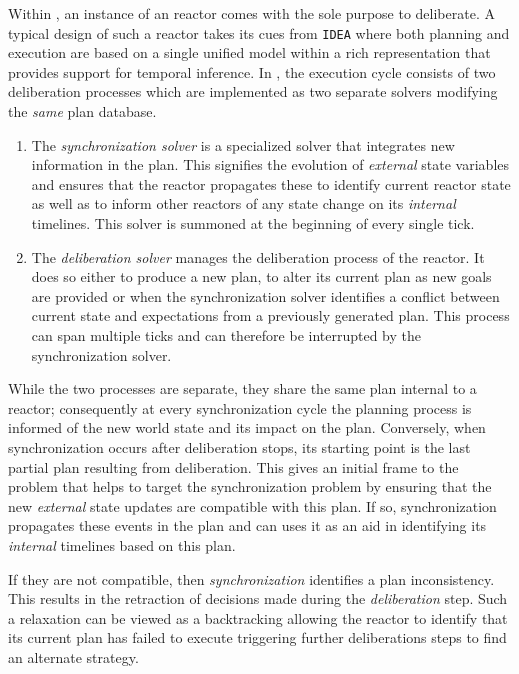 Within \rx, an instance of an \eu reactor comes with the sole purpose
to deliberate. A typical design of such a reactor takes its cues from
\texttt{IDEA} \cite{mus02, mus06} where both planning and execution
are based on a single unified model within a rich representation that
provides support for temporal inference. In \rx, the execution cycle
consists of two deliberation processes which are implemented as two
separate \eu solvers modifying the \emph{same} plan database.

\begin{enumerate}

\item The \emph{synchronization solver} is a specialized \eu solver
  that integrates new information in the plan. This signifies the
  evolution of \emph{external} state variables and ensures that the
  reactor propagates these to identify current reactor state as well
  as to inform other reactors of any state change on its
  \emph{internal} timelines. This solver is summoned at the beginning
  of every single tick.

\item The \emph{deliberation solver} manages the deliberation process
  of the reactor. It does so either to produce a new plan, to alter
  its current plan as new goals are provided or when the
  synchronization solver identifies a conflict between current state
  and expectations from a previously generated plan. This process can
  span multiple ticks and can therefore be interrupted by the
  synchronization solver.

\end{enumerate}

While the two processes are separate, they share the same plan
internal to a reactor; consequently at every synchronization cycle the
planning process is informed of the new world state and its impact on
the plan. Conversely, when synchronization occurs after deliberation
stops, its starting point is the last partial plan resulting from
deliberation. This gives an initial frame to the problem that helps to
target the synchronization problem by ensuring that the new {\em
  external} state updates are compatible with this plan. If so,
synchronization propagates these events in the plan and can uses it as
an aid in identifying its {\em internal} timelines  based on this plan. 

If they are not compatible, then {\em synchronization} identifies a
plan inconsistency. This results in the retraction of decisions made
during the  {\em deliberation} step. %
Such a relaxation can be viewed as a backtracking %
allowing the reactor to identify that its current plan has failed to
execute triggering further deliberations steps to find an alternate
strategy.

